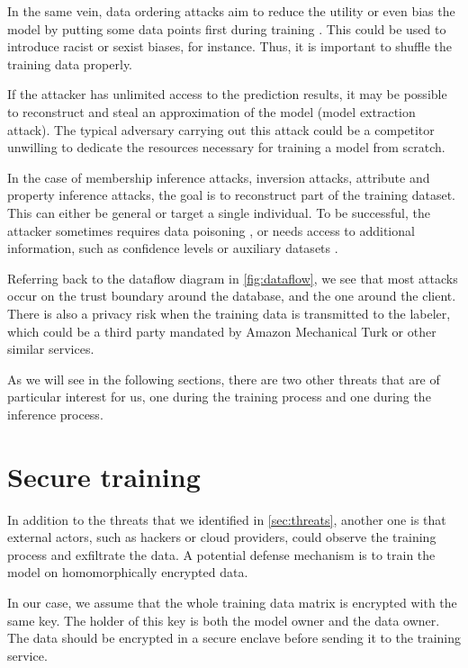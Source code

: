 \documentclass[a4paper,11pt,oneside]{report}
\begin{document}
In the same vein, data ordering attacks aim to reduce the utility or even bias the model by putting some data points first during training \cite{shumailov_manipulating_2021}. 
This could be used to introduce racist or sexist biases, for instance. 
Thus, it is important to shuffle the training data properly.

If the attacker has unlimited access to the prediction results, it may be possible to reconstruct and steal an approximation of the model (model extraction attack). 
The typical adversary carrying out this attack could be a competitor unwilling to dedicate the resources necessary for training a model from scratch.

In the case of membership inference attacks, inversion attacks, attribute and property inference attacks, the goal is to reconstruct part of the training dataset. 
This can either be general or target a single individual. To be successful, the attacker sometimes requires data poisoning \cite{hidano_model_2017}, or needs access to additional information, such as confidence levels or auxiliary datasets \cite{fredrikson_model_2015, wang_variational_2022}.

Referring back to the dataflow diagram in \autoref{fig:dataflow}, we see that most attacks occur on the trust boundary around the database, and the one around the client.
There is also a privacy risk when the training data is transmitted to the labeler, which could be a third party mandated by Amazon Mechanical Turk or other similar services.

As we will see in the following sections, there are two other threats that are of particular interest for us, one during the training process and one during the inference process.

\section{Secure training}\label{sec:secure_training}

In addition to the threats that we identified in \autoref{sec:threats}, another one is that external actors, such as hackers or cloud providers, could observe the training process and exfiltrate the data. 
A potential defense mechanism is to train the model on homomorphically encrypted data.

In our case, we assume that the whole training data matrix is encrypted with the same key. 
The holder of this key is both the model owner and the data owner. 
The data should be encrypted in a secure enclave before sending it to the training service. 
\end{document}
